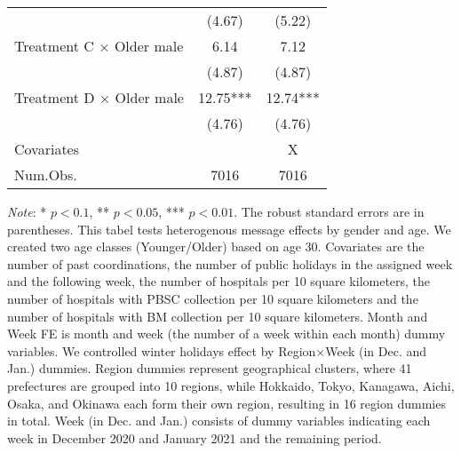 \documentclass[12pt, a4paper]{article}
\begin{document}
\begin{table}[H]
\begin{threeparttable}
\begin{tabular}[t]{lcc}
 & (\num{4.67}) & (\num{5.22})\\
Treatment C $\times$ Older male & \num{6.14} & \num{7.12}\\
 & (\num{4.87}) & (\num{4.87})\\
Treatment D $\times$ Older male & \num{12.75}*** & \num{12.74}***\\
 & (\num{4.76}) & (\num{4.76})\\
\midrule
Covariates &  & X\\
Num.Obs. & \num{7016} & \num{7016}\\
\bottomrule
\end{tabular}
\begin{tablenotes}
\item \emph{Note}: * $p < 0.1$, ** $p < 0.05$, *** $p < 0.01$. The robust standard errors are in parentheses. This tabel tests heterogenous message effects by gender and age. We created two age classes (Younger/Older) based on age 30. Covariates are the number of past coordinations, the number of public holidays in the assigned week and the following week, the number of hospitals per 10 square kilometers, the number of hospitals with PBSC collection per 10 square kilometers and the number of hospitals with BM collection per 10 square kilometers. Month and Week FE is month and week (the number of a week within each month) dummy variables. We controlled winter holidays effect by Region$\times$Week (in Dec. and Jan.) dummies. Region dummies represent geographical clusters, where 41 prefectures are grouped into 10 regions, while Hokkaido, Tokyo, Kanagawa, Aichi, Osaka, and Okinawa each form their own region, resulting in 16 region dummies in total. Week (in Dec. and Jan.) consists of dummy variables indicating each week in December 2020 and January 2021 and the remaining period.
\end{tablenotes}
\end{threeparttable}
\end{table}
\end{document}

